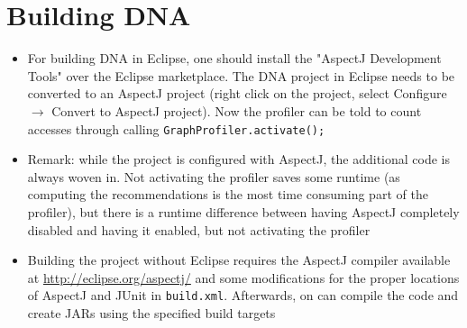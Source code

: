 \section{Building DNA}
	\begin{itemize}
		\item For building DNA in Eclipse, one should install the "AspectJ Development Tools"
			over the Eclipse marketplace. The DNA project in Eclipse needs to be converted to an
			AspectJ project (right click on the project, select Configure $\rightarrow$ Convert to
			AspectJ project). Now the profiler can be told to count accesses through calling
			\texttt{Graph\allowbreak Profiler.\allowbreak activate();}
		\item Remark: while the project is configured with AspectJ, the additional code is
			always woven in. Not activating the profiler saves some runtime (as computing the
			recommendations is the most time consuming part of the profiler), but there is a
			runtime difference between having AspectJ completely disabled and having it enabled,
			but not activating the profiler
		\item Building the project without Eclipse requires the AspectJ compiler available at
			\url{http://eclipse.org/aspectj/} and some modifications for the proper locations of
			AspectJ and JUnit in \texttt{build.xml}. Afterwards, on can compile the code and create
			JARs using the specified build targets
	\end{itemize}
